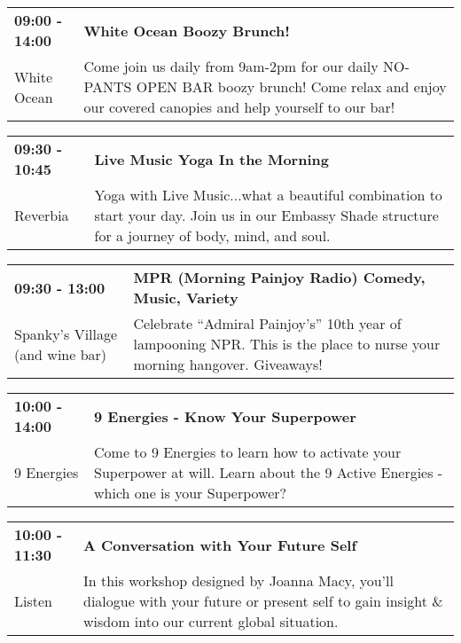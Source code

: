 \begin{tabular}{ p{1in} p{2.2in} }
    \textbf{09:00 - 14:00} & \textbf{White Ocean Boozy Brunch!} \\
    White Ocean \newline  & Come join us daily from 9am-2pm for our daily NO-PANTS OPEN BAR boozy brunch! Come relax and enjoy our covered canopies and help yourself to our bar! \\
    \hline 
\end{tabular}
    
\begin{tabular}{ p{1in} p{2.2in} }
    \textbf{09:30 - 10:45} & \textbf{Live Music Yoga In the Morning } \\
    Reverbia \newline  & Yoga with Live Music...what a beautiful combination to start your day. Join us in our Embassy Shade structure for a journey of body, mind, and soul. \\
    \hline 
\end{tabular}
    
\begin{tabular}{ p{1in} p{2.2in} }
    \textbf{09:30 - 13:00} & \textbf{MPR (Morning Painjoy Radio) Comedy, Music, Variety} \\
    Spanky's Village (and wine bar) \newline  & Celebrate ``Admiral Painjoy's'' 10th year of lampooning NPR.  This is the place to nurse your morning hangover.  Giveaways! \\
    \hline 
\end{tabular}
    
\begin{tabular}{ p{1in} p{2.2in} }
    \textbf{10:00 - 14:00} & \textbf{9 Energies - Know Your Superpower} \\
    9 Energies \newline  & Come to 9 Energies to learn how to activate your Superpower at will. Learn about the 9 Active Energies - which one is your Superpower? \\
    \hline 
\end{tabular}
    
\begin{tabular}{ p{1in} p{2.2in} }
    \textbf{10:00 - 11:30} & \textbf{A Conversation with Your Future Self} \\
    Listen \newline  & In this workshop designed by Joanna Macy, you'll dialogue with your future or present self to gain insight \& wisdom into our current global situation. \\
    \hline 
\end{tabular}
    
